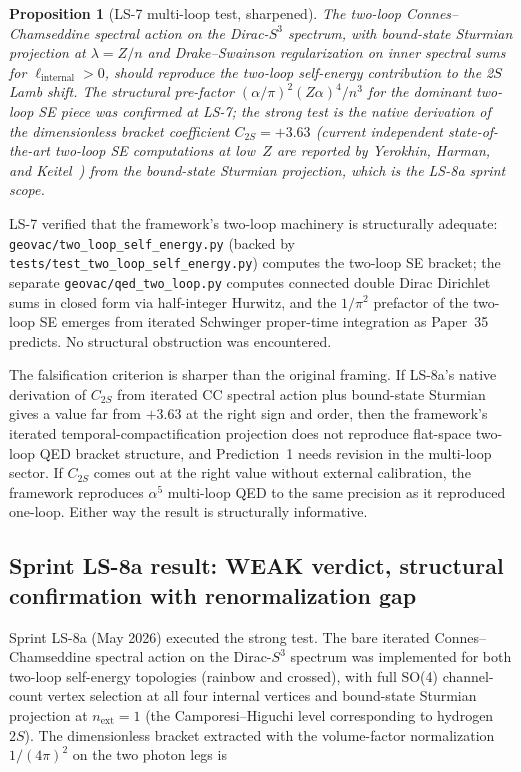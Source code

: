 \documentclass[11pt]{article}
\newtheorem{proposition}{Proposition}
\begin{document}
\begin{proposition}[LS-7 multi-loop test, sharpened]
\label{prop:ls7_sharpened}
The two-loop Connes--Chamseddine spectral action on the
Dirac-$S^3$ spectrum, with bound-state Sturmian projection at
$\lambda = Z/n$ and Drake--Swainson regularization on inner spectral
sums for $\ell_\text{internal} > 0$, should reproduce the
two-loop self-energy contribution to the 2$S$ Lamb shift.  The
structural pre-factor
$(\alpha/\pi)^2 (Z\alpha)^4 / n^3$ for the dominant two-loop SE
piece was confirmed at LS-7; the strong test is the native derivation
of the dimensionless bracket coefficient $C_{2S} = +3.63$ (current
independent state-of-the-art two-loop SE computations at low~$Z$ are
reported by Yerokhin, Harman, and
Keitel~\cite{yerokhin2024_two_loop_se}) from the
bound-state Sturmian projection, which is the LS-8a sprint scope.
\end{proposition}

LS-7 verified that the framework's two-loop machinery is structurally
adequate: \texttt{geovac/two\_loop\_self\_energy.py} (backed by
\texttt{tests/test\_two\_loop\_self\_energy.py}) computes the two-loop
SE bracket; the separate \texttt{geovac/qed\_two\_loop.py} computes
connected double Dirac Dirichlet sums in closed form via
half-integer Hurwitz, and
the $1/\pi^2$ prefactor of the two-loop SE emerges from iterated
Schwinger proper-time integration as Paper~35 predicts.  No
structural obstruction was encountered.

The falsification criterion is sharper than the original framing.
If LS-8a's native derivation of $C_{2S}$ from iterated CC spectral
action plus bound-state Sturmian gives a value far from $+3.63$ at
the right sign and order, then the framework's iterated
temporal-compactification projection does not reproduce flat-space
two-loop QED bracket structure, and Prediction~1 needs revision in
the multi-loop sector.  If $C_{2S}$ comes out at the right value
without external calibration, the framework reproduces $\alpha^5$
multi-loop QED to the same precision as it reproduced one-loop.
Either way the result is structurally informative.

\subsection{Sprint LS-8a result: WEAK verdict, structural confirmation
with renormalization gap}
\label{sec:ls8a_result}

Sprint LS-8a (May 2026) executed the strong test.  The bare iterated
Connes--Chamseddine spectral action on the Dirac-$S^3$ spectrum was
implemented for both two-loop self-energy topologies (rainbow and
crossed), with full SO(4) channel-count vertex selection at all four
internal vertices and bound-state Sturmian projection at $n_\text{ext}
= 1$ (the Camporesi--Higuchi level corresponding to hydrogen $2S$).
The dimensionless bracket extracted with the volume-factor
normalization $1/(4\pi)^2$ on the two photon legs is
\end{document}
